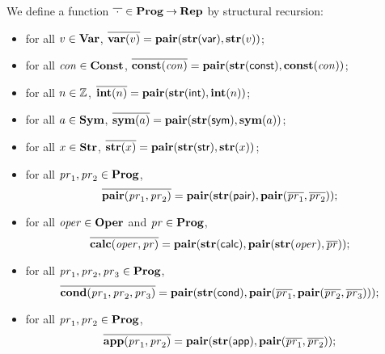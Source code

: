 We define a function $\overline{\;\cdot\;}\in\mathbf{Prog}\mathbin{\to}\mathbf{Rep}$
by structural recursion:
\begin{itemize}
\item for all $v\in\mathbf{Var}$,
  $\overline{\mathbf{var}(v)} =
  \mathbf{pair}(\mathbf{str}(\mathsf{var}), \mathbf{str}(v))$;

\item for all $\mathit{con}\in\mathbf{Const}$,
  $\overline{\mathbf{const}(\mathit{con})} =
  \mathbf{pair}(\mathbf{str}(\mathsf{const}), \mathbf{const}(\mathit{con}))$;

\item for all $n\in\mathbb{Z}$, $\overline{\mathbf{int}(n)} =
  \mathbf{pair}(\mathbf{str}(\mathsf{int}), \mathbf{int}(n))$;

\item for all $a\in\mathbf{Sym}$, $\overline{\mathbf{sym}(a)} =
  \mathbf{pair}(\mathbf{str}(\mathsf{sym}), \mathbf{sym}(a))$;

\item for all $x\in\mathbf{Str}$, $\overline{\mathbf{str}(x)} =
  \mathbf{pair}(\mathbf{str}(\mathsf{str}), \mathbf{str}(x))$;

\item for all $\mathit{pr}_1,\mathit{pr}_2\in\mathbf{Prog}$,
  \begin{displaymath}
    \overline{\mathbf{pair}(\mathit{pr}_1,\mathit{pr}_2)} =
    \mathbf{pair}(\mathbf{str}(\mathsf{pair}),
    \mathbf{pair}(\overline{\mathit{pr}_1}, \overline{\mathit{pr}_2})) ;
  \end{displaymath}

\item for all $\mathit{oper}\in\mathbf{Oper}$ and $\mathit{pr}\in\mathbf{Prog}$,
  \begin{displaymath}
    \overline{\mathbf{calc}(\mathit{oper},\mathit{pr})} =
    \mathbf{pair}(\mathbf{str}(\mathsf{calc}),
    \mathbf{pair}(\mathbf{str}(\mathit{oper}), \overline{\mathit{pr}})) ;
  \end{displaymath}

\item for all $\mathit{pr}_1,\mathit{pr}_2,\mathit{pr}_3\in\mathbf{Prog}$,
  \begin{displaymath}
    \overline{\mathbf{cond}(\mathit{pr}_1,\mathit{pr}_2,\mathit{pr}_3)} =
    \mathbf{pair}(\mathbf{str}(\mathsf{cond}),
    \mathbf{pair}(\overline{\mathit{pr}_1},
    \mathbf{pair}(\overline{\mathit{pr}_2}, \overline{\mathit{pr}_3}))) ;
  \end{displaymath}

\item for all $\mathit{pr}_1,\mathit{pr}_2\in\mathbf{Prog}$,
  \begin{displaymath}
    \overline{\mathbf{app}(\mathit{pr}_1,\mathit{pr}_2)} =
    \mathbf{pair}(\mathbf{str}(\mathsf{app}),
    \mathbf{pair}(\overline{\mathit{pr}_1}, \overline{\mathit{pr}_2})) ;
  \end{displaymath}


\end{itemize}
